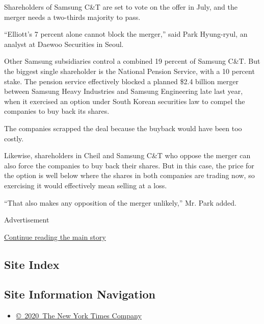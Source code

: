 Shareholders of Samsung C\&T are set to vote on the offer in July, and
the merger needs a two-thirds majority to pass.

``Elliott's 7 percent alone cannot block the merger,'' said Park
Hyung-ryul, an analyst at Daewoo Securities in Seoul.

Other Samsung subsidiaries control a combined 19 percent of Samsung
C\&T. But the biggest single shareholder is the National Pension
Service, with a 10 percent stake. The pension service effectively
blocked a planned \$2.4 billion merger between Samsung Heavy Industries
and Samsung Engineering late last year, when it exercised an option
under South Korean securities law to compel the companies to buy back
its shares.

The companies scrapped the deal because the buyback would have been too
costly.

Likewise, shareholders in Cheil and Samsung C\&T who oppose the merger
can also force the companies to buy back their shares. But in this case,
the price for the option is well below where the shares in both
companies are trading now, so exercising it would effectively mean
selling at a loss.

``That also makes any opposition of the merger unlikely,'' Mr. Park
added.

Advertisement

\protect\hyperlink{after-bottom}{Continue reading the main story}

\hypertarget{site-index}{%
\subsection{Site Index}\label{site-index}}

\hypertarget{site-information-navigation}{%
\subsection{Site Information
Navigation}\label{site-information-navigation}}

\begin{itemize}
\tightlist
\item
  \href{https://help.nytimes.com/hc/en-us/articles/115014792127-Copyright-notice}{©~2020~The
  New York Times Company}
\end{itemize}

